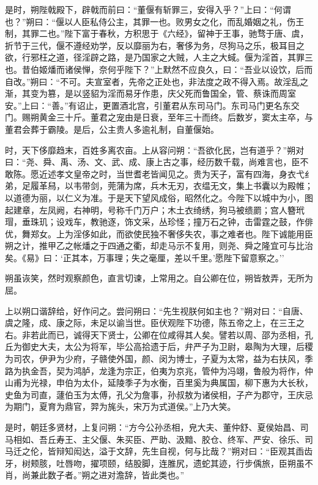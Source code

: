 \documentclass[]{article}
\begin{document}
是时，朔陛戟殿下，辟戟而前曰：``董偃有斩罪三，安得入乎？''上曰：``何谓也？''朔曰：``偃以人臣私侍公主，其罪一也。败男女之化，而乱婚姻之礼，伤王制，其罪二也。''陛下富于春秋，方积思于《六经》，留神于王事，驰骛于唐、虞，折节于三代，偃不遵经劝学，反以靡丽为右，奢侈为务，尽狗马之乐，极耳目之欲，行邪枉之道，径淫辟之路，是乃国家之大贼，人主之大蜮。偃为淫首，其罪三也。昔伯姬燔而诸侯惮，奈何乎陛下？''上默然不应良久，曰：``吾业以设饮，后而自改。''朔曰：``不可。夫宣室者，先帝之正处也，非法度之政不得入焉。故淫乱之渐，其变为篡，是以竖貂为淫而易牙作患，庆父死而鲁国全，管、蔡诛而周室安。''上曰：``善。''有诏止，更置酒北宫，引董君从东司马门。东司马门更名东交门。赐朔黄金三十斤。董君之宠由是日衰，至年三十而终。后数岁，窦太主卒，与董君会葬于霸陵。是后，公主贵人多逾礼制，自董偃始。

时，天下侈靡趋末，百姓多离农亩。上从容问朔：``吾欲化民，岂有道乎？''朔对曰：``尧、舜、禹、汤、文、武、成、康上古之事，经历数千载，尚难言也，臣不敢陈。愿近述孝文皇帝之时，当世耆老皆闻见之。贵为天子，富有四海，身衣弋纟弟，足履革舄，以韦带剑，莞蒲为席，兵木无刃，衣缊无文，集上书囊以为殿帷；以道德为丽，以仁义为准。于是天下望风成俗，昭然化之。今陛下以城中为小，图起建章，左凤阙，右神明，号称千门万户；木土衣绮绣，狗马被缋罽；宫人簪玳瑁，垂珠玑；设戏车，教驰逐，饰文采，丛珍怪；撞万石之钟，击雷霆之鼓，作俳优，舞郑女。上为淫侈如此，而欲使民独不奢侈失农，事之难者也。陛下诚能用臣朔之计，推甲乙之帐燔之于四通之衢，却走马示不复用，则尧、舜之隆宜可与比治矣。《易》曰：`正其本，万事理；失之毫厘，差以千里。'愿陛下留意察之。''

朔虽诙笑，然时观察颜色，直言切谏，上常用之。自公卿在位，朔皆敖弄，无所为屈。

上以朔口谐辞给，好作问之。尝问朔曰：``先生视朕何如主也？''朔对曰：``自唐、虞之隆，成、康之际，未足以谕当世。臣伏观陛下功德，陈五帝之上，在三王之右。非若此而已，诚得天下贤士，公卿在位咸得其人矣。譬若以周、邵为丞相，孔丘为御史大夫，太公为将军，毕公高拾遗于后，弁严子为卫尉，皋陶为大理，后稷为司农，伊尹为少府，子赣使外国，颜、闵为博士，子夏为太常，益为右扶风，季路为执金吾，契为鸿胪，龙逢为宗正，伯夷为京兆，管仲为冯翊，鲁般为将作，仲山甫为光禄，申伯为太仆，延陵季子为水衡，百里奚为典属国，柳下惠为大长秋，史鱼为司直，蘧伯玉为太傅，孔父为詹事，孙叔敖为诸侯相，子产为郡守，王庆忌为期门，夏育为鼎官，羿为旄头，宋万为式道侯。''上乃大笑。

是时，朝廷多贤材，上复问朔：``方今公孙丞相，皃大夫、董仲舒、夏侯始昌、司马相如、吾丘寿王、主父偃、朱买臣、严助、汲黯、胶仓、终军、严安、徐乐、司马迁之伦，皆辩知闳达，溢于文辞，先生自视，何与比哉？''朔对曰：``臣观其臿齿牙，树颊胲，吐唇吻，擢项颐，结股脚，连脽尻，遗蛇其迹，行步偊旅，臣朔虽不肖，尚兼此数子者。''朔之进对澹辞，皆此类也。''
\end{document}
